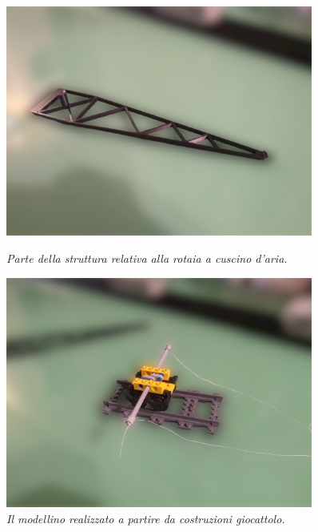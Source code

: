 \documentclass[11pt, a4paper, twoside]{article}
\begin{document}
\begin{figure}[h!]
  \centering
\begin{minipage}{0.45\textwidth}
  \centering
  \includegraphics[width=0.9\textwidth]{../../media/img/crane_air-processed.png}
  \caption{\textit{Parte della struttura relativa alla rotaia a cuscino d'aria.}}
  \label{photo_crane_air}
\end{minipage}
\begin{minipage}{0.45\textwidth}
  \centering
  \includegraphics[width=0.9\textwidth]{../../media/img/lego_cart-processed.png}
  \caption{\textit{Il modellino realizzato a partire da costruzioni giocattolo.}}
  \label{photo_lego}
\end{minipage}
\end{figure}
\end{document}
